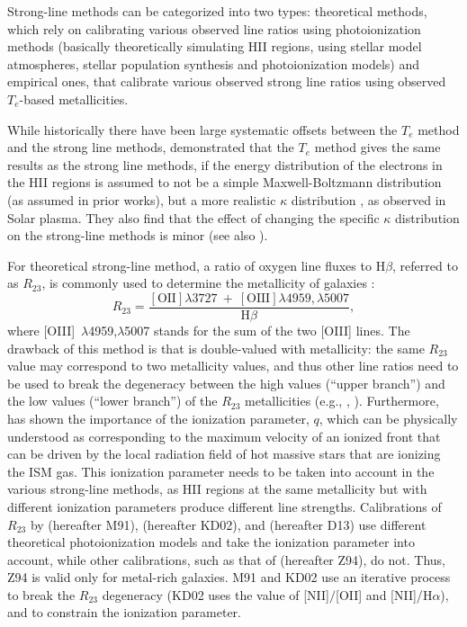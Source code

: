 \documentclass{emulateapj}
\newcommand{\ha}{\ensuremath{\mathrm{H}\alpha}}
\newcommand{\hb}{\ensuremath{\mathrm{H}\beta}}
\begin{document}
Strong-line methods can be categorized into two types: theoretical methods, which rely on calibrating various observed line ratios using photoionization methods (basically theoretically simulating HII regions, using stellar model atmospheres, stellar population synthesis and photoionization models) and empirical ones, that calibrate various observed strong line ratios using observed $T_e$-based metallicities. 

While historically there have been large systematic offsets between the $T_e$ method and the strong line methods, \citet{dopita13} demonstrated that the $T_e$ method gives the same results as the strong line methods, if the energy distribution of the electrons in the HII regions is assumed to not be a simple Maxwell-Boltzmann distribution (as assumed in prior works), but a more realistic $\kappa$ distribution \citep{vasyliunas68, owoki83}, as observed in Solar plasma. They also find that the effect of changing the specific $\kappa$ distribution on the strong-line methods is minor (see also \citealt{Mendoza14}). 


For theoretical strong-line method, a ratio of oxygen line fluxes to \hb, referred to as $R_{23}$, is commonly used to determine the metallicity of galaxies  \citep{pagel79}:
$$R_{23}=\frac{\mathrm{[OII]} \lambda 3727~+~\mathrm{[OIII]} \lambda 4959,\lambda 5007}{\mathrm{H}\beta},$$ 
where [OIII]~$\lambda$4959,$\lambda$5007 stands for the sum of the two [OIII] lines.
The drawback of this method is that is double-valued with metallicity: the same $R_{23}$ value may correspond to two metallicity values, and thus other line ratios need to be used to break the degeneracy between the high values (``upper branch'') and the low values (``lower branch'') of the $R_{23}$ metallicities (e.g., \citealt{kewley08},  \citealt{moustakas10}). 
Furthermore, \citet{kewley02} has shown the importance of the ionization parameter, $q$, which can be physically understood as corresponding to the maximum velocity of an ionized front that can be driven by the local radiation field of hot massive stars that are ionizing the ISM gas. This ionization parameter needs to be taken into account in the various strong-line methods, as HII regions at the same metallicity but with different ionization parameters produce different line strengths. Calibrations of $R_{23}$ by \citet{mcgaugh91} (hereafter M91), \citet{kewley02} (hereafter KD02), and \citet{dopita13} (hereafter D13) use different theoretical photoionization models and take the ionization parameter into account, while other calibrations, such as that of \citet{zaritsky94} (hereafter Z94), do not. Thus, Z94 is valid only for metal-rich galaxies.  M91 and KD02 use an iterative process to break the $R_{23}$ degeneracy  (KD02 uses the value of [NII]$/$[OII] and [NII]/\ha), and to constrain the ionization parameter.
\end{document}
